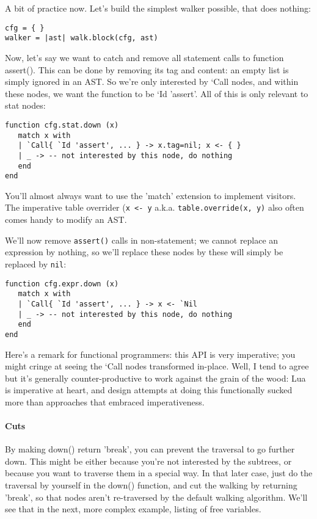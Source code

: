 A bit of practice now. Let's build the simplest walker possible, that does
nothing:

\begin{verbatim}
cfg = { }
walker = |ast| walk.block(cfg, ast)
\end{verbatim}

Now, let's say we want to catch and remove all statement calls to function
assert(). This can be done by removing its tag and content: an empty list is
simply ignored in an AST. So we're only interested by `Call nodes, and within
these nodes, we want the function to be `Id 'assert'. All of this is only
relevant to stat nodes:

\begin{verbatim}
function cfg.stat.down (x)
   match x with
   | `Call{ `Id 'assert', ... } -> x.tag=nil; x <- { }
   | _ -> -- not interested by this node, do nothing
   end
end
\end{verbatim}

You'll almost always want to use the 'match' extension to implement visitors.
The imperative table overrider ({\tt x <- y} a.k.a. {\tt table.override(x, y)}
also often comes handy to modify an AST.

We'll now remove {\tt assert()} calls in non-statement; we cannot replace an
expression by nothing, so we'll replace these nodes by these will simply be
replaced by {\tt nil}:

\begin{verbatim}
function cfg.expr.down (x)
   match x with
   | `Call{ `Id 'assert', ... } -> x <- `Nil
   | _ -> -- not interested by this node, do nothing
   end
end
\end{verbatim}


Here's a remark for functional programmers: this API is very imperative; you
might cringe at seeing the `Call nodes transformed in-place. Well, I tend to
agree but it's generally counter-productive to work against the grain of the
wood: Lua is imperative at heart, and design attempts at doing this functionally
sucked more than approaches that embraced imperativeness. 

\paragraph{Cuts}
By making down() return 'break', you can prevent the traversal to go further
down. This might be either because you're not interested by the subtrees, or
because you want to traverse them in a special way. In that later case, just do
the traversal by yourself in the down() function, and cut the walking by
returning 'break', so that nodes aren't re-traversed by the default walking
algorithm. We'll see that in the next, more complex example, listing of free
variables.

